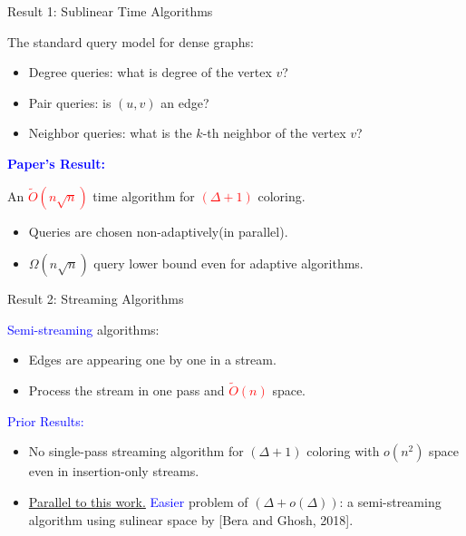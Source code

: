 \documentclass[aspectratio=169,xcolor=dvipsnames]{beamer}
\begin{document}
	\begin{frame}{Result 1: Sublinear Time Algorithms}
		
		The standard query model for dense graphs:
		\begin{itemize}
			\item Degree queries: what is degree of the vertex {\color{red}$v$}?
			\item Pair queries: is {\color{red}$(u,v)$} an edge?
			\item Neighbor queries: what is the {\color{red}$k$}-th neighbor of the vertex {\color{red}$v$}?
		\end{itemize}
		
		\vspace{0.5em}
		\textcolor{blue}{\textbf{Paper's Result:}}
		
		\vspace{0.5em}
		\begin{block}{}
			\centering
			An \textcolor{red}{$\tilde{O}(n\sqrt{n})$} time algorithm for \textcolor{red}{$(\Delta + 1)$} coloring.
		\end{block}
		
		\begin{itemize}
			\item Queries are chosen {\color{blue}non-adaptively}(in parallel).
			\item {\color{red}$\Omega(n\sqrt{n})$} query {\color{blue}lower bound} even for adaptive algorithms.
		\end{itemize}
		
	\end{frame}
	
	\begin{frame}{Result 2: Streaming Algorithms}
		
		\textcolor{blue}{Semi-streaming} algorithms:
		\begin{itemize}
			\item Edges are appearing one by one in a stream.
			\item Process the stream in one pass and \textcolor{red}{$\tilde{O}(n)$} space.
		\end{itemize}
		
		\vspace{0.5em}
		\textcolor{blue}{Prior Results:}
		\begin{itemize}
			\item No single-pass streaming algorithm for {\color{red}$(\Delta + 1)$} coloring with {\color{red}$o(n^2)$} space even in insertion-only streams.
			\item \underline{Parallel to this work.} \textcolor{blue}{Easier} problem of {\color{red}$(\Delta + o(\Delta))$}: a semi-streaming algorithm using sulinear space by {\color{green!50!black}[Bera and Ghosh, 2018]}.
		\end{itemize}
		
	\end{frame}
	
\end{document}
